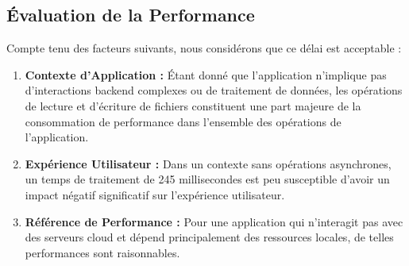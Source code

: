 \documentclass{article}
\begin{document}
\subsection{Évaluation de la Performance}
Compte tenu des facteurs suivants, nous considérons que ce délai est acceptable :
\begin{enumerate}
    \item \textbf{Contexte d'Application :} Étant donné que l'application n'implique pas d'interactions backend complexes ou de traitement de données, les opérations de lecture et d'écriture de fichiers constituent une part majeure de la consommation de performance dans l'ensemble des opérations de l'application.
    \item \textbf{Expérience Utilisateur :} Dans un contexte sans opérations asynchrones, un temps de traitement de 245 millisecondes est peu susceptible d'avoir un impact négatif significatif sur l'expérience utilisateur.
    \item \textbf{Référence de Performance :} Pour une application qui n'interagit pas avec des serveurs cloud et dépend principalement des ressources locales, de telles performances sont raisonnables.
\end{enumerate}

\end{document}
